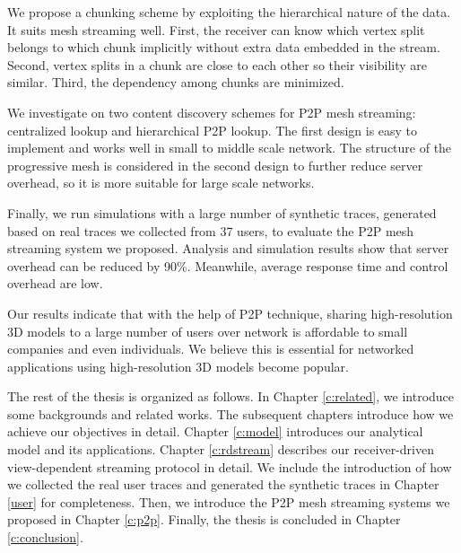    We propose a chunking scheme by exploiting the hierarchical 
    nature of the data. It suits mesh streaming well.
    First, the receiver can know which vertex split belongs to
    which chunk implicitly without extra data embedded in the stream.
    Second, vertex splits in a chunk are close to each other so
    their visibility are similar. Third, the dependency among chunks
    are minimized.

    We investigate on two content discovery schemes for P2P
    mesh streaming: centralized lookup and hierarchical P2P lookup.
    The first design is easy to implement and works well in small to 
    middle scale network. The structure of the progressive
    mesh is considered in the second design to further
    reduce server overhead, so it is more suitable for large scale networks. 
    
    Finally, we run simulations 
    with a large number of synthetic traces,
    generated based on real traces we collected from 37 users,
    to evaluate the P2P
    mesh streaming system we proposed.  
    Analysis and
    simulation results show that server overhead can be
    reduced by 90\%. Meanwhile,  average response time and
    control overhead are low.

    Our results indicate that with the help of P2P technique,
    sharing high-resolution
    3D models to a large number of users over network is affordable
    to small companies and even individuals. We believe this is
    essential for networked applications using high-resolution 3D models
    become popular.


    The rest of the thesis is organized as follows.
    In Chapter \ref{c:related}, we introduce some backgrounds and related works.
    The subsequent chapters introduce how we achieve our objectives in detail.
    Chapter \ref{c:model} introduces our analytical model and its applications.
    Chapter \ref{c:rdstream} describes our receiver-driven view-dependent streaming
    protocol in detail. 
    We include the introduction of how we collected the real user traces and 
    generated the synthetic traces in Chapter \ref{user} for completeness. 
    Then, we introduce the P2P mesh streaming systems we proposed
    in Chapter \ref{c:p2p}. Finally, the thesis is concluded in
    Chapter \ref{c:conclusion}.

